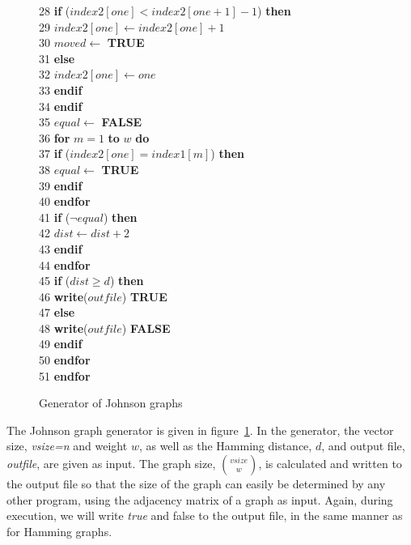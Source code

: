 \begin{figure}
{\begin{tabbing}
28 \> \> \> \> \> \> {\bf if} ($index2[one] < index2[one+1]-1$) {\bf then} \\
29 \> \> \> \> \> \> \> $index2[one] \leftarrow index2[one]+1$ \\
30 \> \> \> \> \> \> \> $moved \leftarrow$ {\bf TRUE} \\
31 \> \> \> \> \> \> {\bf else} \\
32 \> \> \> \> \> \> \> $index2[one] \leftarrow one$ \\
33 \> \> \> \> \> \> {\bf endif} \\
34 \> \> \> \> \> {\bf endif} \\
35 \> \> \> \> \> $equal \leftarrow$ {\bf FALSE} \\
36 \> \> \> \> \> {\bf for} $m = 1$ {\bf to} $w$ {\bf do} \\ 
37 \> \> \> \> \> \> {\bf if} ($index2[one] = index1[m]$) {\bf then} \\
38 \> \> \> \> \> \> \> $equal \leftarrow$ {\bf TRUE} \\
39 \> \> \> \> \> \> {\bf endif} \\
40 \> \> \> \> \> {\bf endfor} \\
41 \> \> \> \> \> {\bf if} ($\neg equal$) {\bf then} \\
42 \> \> \> \> \> \> $dist\leftarrow dist+2$ \\
43 \> \> \> \> \> {\bf endif} \\
44 \> \> \> \> {\bf endfor} \\
45 \> \> \> \> {\bf if} ($dist \geq d$) {\bf then} \\
46 \> \> \> \> \> {\bf write}($outfile$) {\bf TRUE} \\
47 \> \> \> \> {\bf else} \\
48 \> \> \> \> \> {\bf write}($outfile$) {\bf FALSE} \\
49 \> \> \> \> {\bf endif} \\
50 \> \> \> {\bf endfor} \\
51 \> \> {\bf endfor} \\
\end{tabbing}
}
\caption{Generator of Johnson graphs}
\label{alg:john}
\end{figure}

The Johnson graph generator is given in figure~\ref{alg:john}. In the
generator, the vector size, {\em vsize=n} and weight $w$, as well as
the Hamming distance, $d$, and output file, {\em outfile}, are given as
input. The graph size, ${vsize \choose w}$, is calculated and written to the
output file so that the size of the graph can easily be determined by any
other program, using the adjacency matrix of a graph as input. Again, during
execution, we will write {\em true} and {\rm false} to the output file, in the
same manner as for Hamming graphs.

